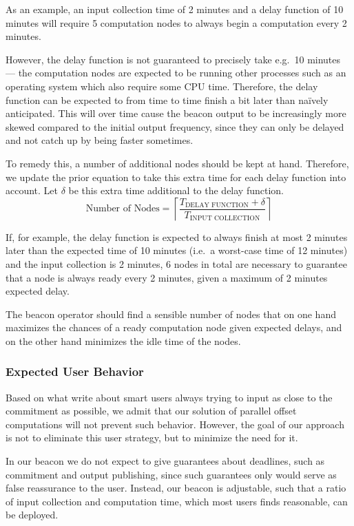 \noindent
As an example, an input collection time of 2 minutes and a delay function of 10 minutes will require 5 computation nodes to always begin a computation every 2 minutes.

However, the delay function is not guaranteed to precisely take e.g.\ 10 minutes --- the computation nodes are expected to be running other processes such as an operating system which also require some CPU time.
Therefore, the delay function can be expected to from time to time finish a bit later than naïvely anticipated.
This will over time cause the beacon output to be increasingly more skewed compared to the initial output frequency, since they can only be delayed and not catch up by being faster sometimes.

To remedy this, a number of additional nodes should be kept at hand.
Therefore, we update the prior equation to take this extra time for each delay function into account.
Let $\delta$ be this extra time additional to the delay function.
\begin{equation*}
    \text{Number of Nodes} = \left\lceil\frac{T_\text{DELAY FUNCTION}+\delta}{T_\text{INPUT COLLECTION}}\right\rceil
\end{equation*}

\noindent
If, for example, the delay function is expected to always finish at most 2 minutes later than the expected time of 10 minutes (i.e.\ a worst-case time of 12 minutes) and the input collection is 2 minutes, 6 nodes in total are necessary to guarantee that a node is always ready every 2 minutes, given a maximum of 2 minutes expected delay.

The beacon operator should find a sensible number of nodes that on one hand maximizes the chances of a ready computation node given expected delays, and on the other hand minimizes the idle time of the nodes.

\subsubsection{Expected User Behavior}
Based on what \citet{randomzoo} write about smart users always trying to input as close to the commitment as possible, we admit that our solution of parallel offset computations will not prevent such behavior.
However, the goal of our approach is not to eliminate this user strategy, but to minimize the need for it.

In our beacon we do not expect to give guarantees about deadlines, such as commitment and output publishing, since such guarantees only would serve as false reassurance to the user.
Instead, our beacon is adjustable, such that a ratio of input collection and computation time, which most users finds reasonable, can be deployed.

